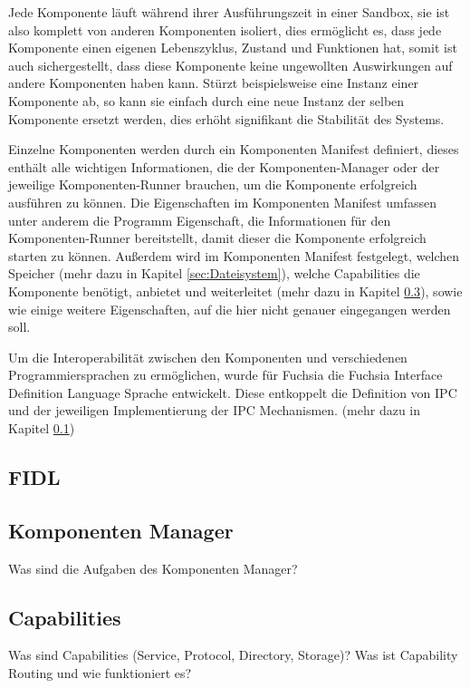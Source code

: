 \documentclass[a4paper]{scrartcl}
\begin{document}
Jede Komponente läuft während ihrer Ausführungszeit in einer Sandbox, sie ist also komplett von anderen Komponenten isoliert, dies ermöglicht es, dass jede Komponente einen eigenen Lebenszyklus, Zustand und Funktionen hat, somit ist auch sichergestellt, dass diese Komponente keine ungewollten Auswirkungen auf andere Komponenten haben kann. Stürzt beispielsweise eine Instanz einer  Komponente ab, so kann sie einfach durch eine neue Instanz der selben Komponente ersetzt werden, dies erhöht signifikant die Stabilität des Systems.

Einzelne Komponenten werden durch ein Komponenten Manifest definiert, dieses enthält alle wichtigen Informationen, die der Komponenten-Manager oder der jeweilige Komponenten-Runner brauchen, um die Komponente erfolgreich ausführen zu können. \cite{https://fuchsia.googlesource.com/fuchsia/+/master/sdk/fidl/fuchsia.sys2/decls/component_decl.fidl} 
Die Eigenschaften im Komponenten Manifest umfassen unter anderem die Programm Eigenschaft,  die Informationen für den Komponenten-Runner bereitstellt, damit dieser die Komponente erfolgreich starten zu können. Außerdem wird im Komponenten Manifest festgelegt, welchen Speicher (mehr dazu in Kapitel \ref{sec:Dateisystem}),  welche Capabilities die Komponente benötigt, anbietet und weiterleitet (mehr dazu in Kapitel \ref{sec:Capabilities}), sowie wie einige weitere Eigenschaften, auf die hier nicht genauer eingegangen werden soll.

Um die Interoperabilität zwischen den Komponenten und verschiedenen Programmiersprachen zu ermöglichen, wurde für Fuchsia die Fuchsia Interface Definition Language Sprache entwickelt. Diese entkoppelt die Definition von IPC und der jeweiligen Implementierung der IPC Mechanismen. (mehr dazu in Kapitel \ref{sec:FIDL})

\subsection{FIDL}
\label{sec:FIDL}
\subsection{Komponenten Manager}

Was sind die Aufgaben des Komponenten Manager?
\subsection{Capabilities}
\label{sec:Capabilities}
Was sind Capabilities (Service, Protocol, Directory, Storage)?
Was ist Capability Routing und wie funktioniert es?
\end{document}
